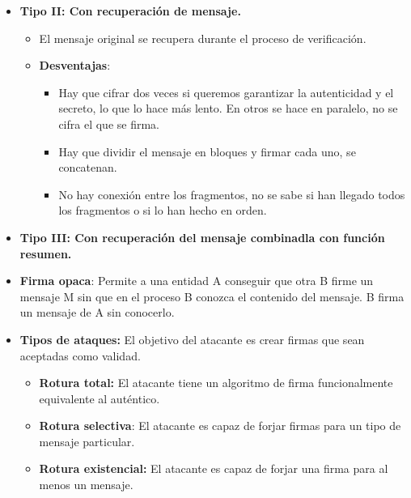 \documentclass[12pt, twoside, openright]{report} %
\begin{document}
\begin{itemize}
    \item \textbf{Tipo II: Con recuperación de mensaje.}
      

      \begin{itemize}
      \item El mensaje original se recupera durante el proceso de
        verificación.
        
      \item \textbf{Desventajas}:
        

        \begin{itemize}
        \item Hay que cifrar dos veces si queremos garantizar la
          autenticidad y el secreto, lo que lo hace más lento. En otros
          se hace en paralelo, no se cifra el que se firma.
          
        \item Hay que dividir el mensaje en bloques y firmar cada uno, se
          concatenan.
          
        \item No hay conexión entre los fragmentos, no se sabe si han
          llegado todos los fragmentos o si lo han hecho en orden.
          
        \end{itemize}
      \end{itemize}
    \item \textbf{Tipo III: Con recuperación del mensaje combinadla con
      función resumen.}
      
    \item \textbf{Firma opaca}: Permite a una entidad A conseguir que otra B
      firme un mensaje M sin que en el proceso B conozca el contenido
      del mensaje. B firma un mensaje de A sin conocerlo.
      
    \item \textbf{Tipos de ataques:} El objetivo del atacante es crear
      firmas que sean aceptadas como validad.
      

      \begin{itemize}
      \item \textbf{Rotura total:} El atacante tiene un algoritmo de firma
        funcionalmente equivalente al auténtico.
        
      \item \textbf{Rotura selectiva}: El atacante es capaz de forjar firmas
        para un tipo de mensaje particular.
        
      \item \textbf{Rotura existencial:} El atacante es capaz de forjar una
        firma para al menos un mensaje.
        

\end{itemize}
\end{itemize}
\end{document}
